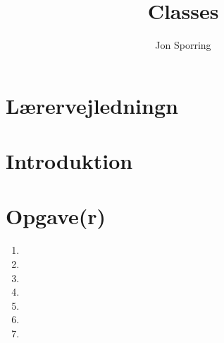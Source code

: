 \documentclass[a4paper,12pt]{article}
\title{Classes}
\author{Jon Sporring}
\begin{document}
\maketitle

\section{Lærervejledningn}

\section{Introduktion}

\section{Opgave(r)}
\begin{enumerate}
\item 
\item 
\item 
\item 
\item 
\item 
\item 
\end{enumerate}
\end{document}
